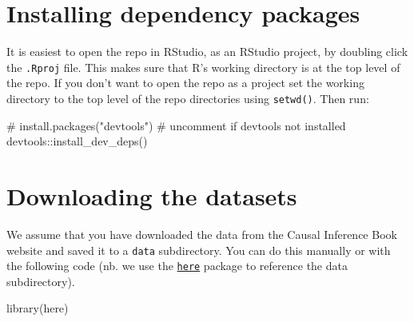 \documentclass[
  10pt,
  a4paper,
]{book}
\newenvironment{Shaded}{\begin{snugshade}}{\end{snugshade}}
\newcommand{\CommentTok}[1]{\textcolor[rgb]{0.37,0.37,0.37}{#1}}
\newcommand{\FunctionTok}[1]{\textcolor[rgb]{0.28,0.35,0.67}{#1}}
\newcommand{\NormalTok}[1]{\textcolor[rgb]{0.00,0.46,0.62}{#1}}
\newcommand{\SpecialCharTok}[1]{\textcolor[rgb]{0.37,0.37,0.37}{#1}}
\begin{document}
\hypertarget{installing-dependency-packages}{%
\section{Installing dependency packages}\label{installing-dependency-packages}}

It is easiest to open the repo in RStudio, as an RStudio project, by doubling click the \texttt{.Rproj} file. This makes sure that R's working directory is at the top level of the repo. If you don't want to open the repo as a project set the working directory to the top level of the repo directories using \texttt{setwd()}. Then run:

\begin{Shaded}
\begin{Highlighting}[]
\CommentTok{\# install.packages("devtools") \# uncomment if devtools not installed}
\NormalTok{devtools}\SpecialCharTok{::}\FunctionTok{install\_dev\_deps}\NormalTok{()}
\end{Highlighting}
\end{Shaded}

\hypertarget{downloading-the-datasets}{%
\section{Downloading the datasets}\label{downloading-the-datasets}}

We assume that you have downloaded the data from the Causal Inference Book website and saved it to a \texttt{data} subdirectory. You can do this manually or with the following code (nb. we use the \href{https://here.r-lib.org/}{\texttt{here}} package to reference the data subdirectory).

\begin{Shaded}
\begin{Highlighting}[]
\FunctionTok{library}\NormalTok{(here)}
\end{Highlighting}
\end{Shaded}
\end{document}

